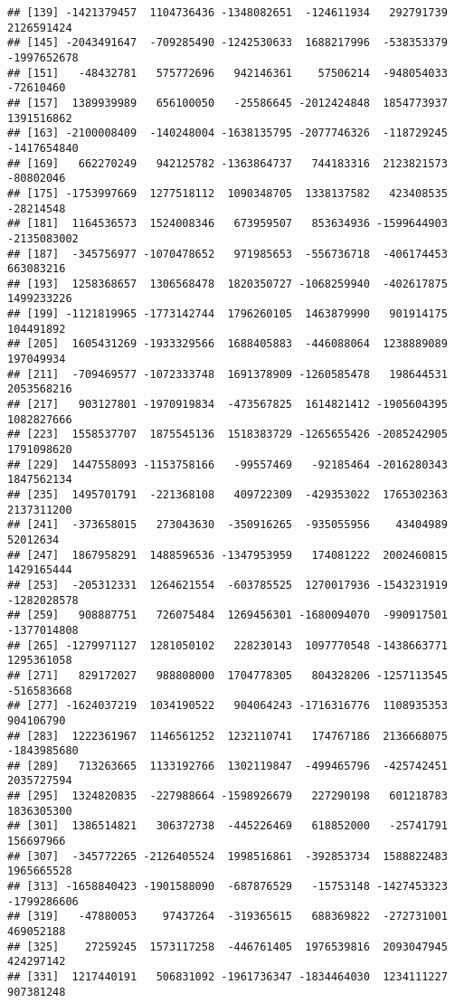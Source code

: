 \documentclass[
]{article}
\begin{document}
\begin{verbatim}
## [139] -1421379457  1104736436 -1348082651  -124611934   292791739  2126591424
## [145] -2043491647  -709285490 -1242530633  1688217996  -538353379 -1997652678
## [151]   -48432781   575772696   942146361    57506214  -948054033   -72610460
## [157]  1389939989   656100050   -25586645 -2012424848  1854773937  1391516862
## [163] -2100008409  -140248004 -1638135795 -2077746326  -118729245 -1417654840
## [169]   662270249   942125782 -1363864737   744183316  2123821573   -80802046
## [175] -1753997669  1277518112  1090348705  1338137582   423408535   -28214548
## [181]  1164536573  1524008346   673959507   853634936 -1599644903 -2135083002
## [187]  -345756977 -1070478652   971985653  -556736718  -406174453   663083216
## [193]  1258368657  1306568478  1820350727 -1068259940  -402617875  1499233226
## [199] -1121819965 -1773142744  1796260105  1463879990   901914175   104491892
## [205]  1605431269 -1933329566  1688405883  -446088064  1238889089   197049934
## [211]  -709469577 -1072333748  1691378909 -1260585478   198644531  2053568216
## [217]   903127801 -1970919834  -473567825  1614821412 -1905604395  1082827666
## [223]  1558537707  1875545136  1518383729 -1265655426 -2085242905  1791098620
## [229]  1447558093 -1153758166   -99557469   -92185464 -2016280343  1847562134
## [235]  1495701791  -221368108   409722309  -429353022  1765302363  2137311200
## [241]  -373658015   273043630  -350916265  -935055956    43404989    52012634
## [247]  1867958291  1488596536 -1347953959   174081222  2002460815  1429165444
## [253]  -205312331  1264621554  -603785525  1270017936 -1543231919 -1282028578
## [259]   908887751   726075484  1269456301 -1680094070  -990917501 -1377014808
## [265] -1279971127  1281050102   228230143  1097770548 -1438663771  1295361058
## [271]   829172027   988808000  1704778305   804328206 -1257113545  -516583668
## [277] -1624037219  1034190522   904064243 -1716316776  1108935353   904106790
## [283]  1222361967  1146561252  1232110741   174767186  2136668075 -1843985680
## [289]   713263665  1133192766  1302119847  -499465796  -425742451  2035727594
## [295]  1324820835  -227988664 -1598926679   227290198   601218783  1836305300
## [301]  1386514821   306372738  -445226469   618852000   -25741791   156697966
## [307]  -345772265 -2126405524  1998516861  -392853734  1588822483  1965665528
## [313] -1658840423 -1901588090  -687876529   -15753148 -1427453323 -1799286606
## [319]   -47880053    97437264  -319365615   688369822  -272731001   469052188
## [325]    27259245  1573117258  -446761405  1976539816  2093047945   424297142
## [331]  1217440191   506831092 -1961736347 -1834464030  1234111227   907381248

\end{verbatim}
\end{document}
